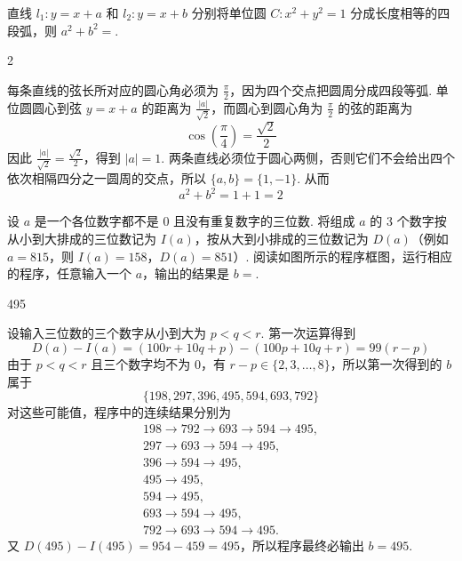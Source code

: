 \begin{problem}
直线 \(l_{1}: y = x + a\) 和 \(l_{2}: y = x + b\) 分别将单位圆 \(C: x^{2} + y^{2} = 1\) 分成长度相等的四段弧，则 \(a^{2} + b^{2}=\)\fillinblank{}.
\end{problem}

\begin{answer}
2
\end{answer}

\begin{solution}
每条直线的弦长所对应的圆心角必须为 \(\frac{\pi}{2}\)，因为四个交点把圆周分成四段等弧. 单位圆圆心到弦 \(y=x+a\) 的距离为 \(\frac{|a|}{\sqrt2}\)，而圆心到圆心角为 \(\frac{\pi}{2}\) 的弦的距离为
\[
\cos\left(\frac{\pi}{4}\right)=\frac{\sqrt2}{2}
\]
因此 \(\frac{|a|}{\sqrt2}=\frac{\sqrt2}{2}\)，得到 \(|a|=1\). 两条直线必须位于圆心两侧，否则它们不会给出四个依次相隔四分之一圆周的交点，所以 \(\{a,b\}=\{1,-1\}\). 从而
\[
a^2+b^2=1+1=2
\]
\end{solution}

\begin{problem}
设 \(a\) 是一个各位数字都不是 0 且没有重复数字的三位数. 将组成 \(a\) 的 \(3\text{ 个}\)数字按从小到大排成的三位数记为 \(I(a)\)，按从大到小排成的三位数记为 \(D(a)\)（例如 \(a = 815\)，则 \(I(a) = 158\)，\(D(a) = 851\)）. 阅读如图所示的程序框图，运行相应的程序，任意输入一个 \(a\)，输出的结果是 \(b =\)\fillinblank{}.

\end{problem}

\begin{answer}
495
\end{answer}

\begin{solution}
设输入三位数的三个数字从小到大为 \(p<q<r\). 第一次运算得到
\[
D(a)-I(a)=(100r+10q+p)-(100p+10q+r)=99(r-p)
\]
由于 \(p<q<r\) 且三个数字均不为 \(0\)，有 \(r-p\in\{2,3,\ldots,8\}\)，所以第一次得到的 \(b\) 属于
\[
\{198,297,396,495,594,693,792\}
\]
对这些可能值，程序中的连续结果分别为
\[
\begin{gathered}
198\to792\to693\to594\to495,\\
297\to693\to594\to495,\\
396\to594\to495,\\
495\to495,\\
594\to495,\\
693\to594\to495,\\
792\to693\to594\to495.
\end{gathered}
\]
又 \(D(495)-I(495)=954-459=495\)，所以程序最终必输出 \(b=495\).
\end{solution}

